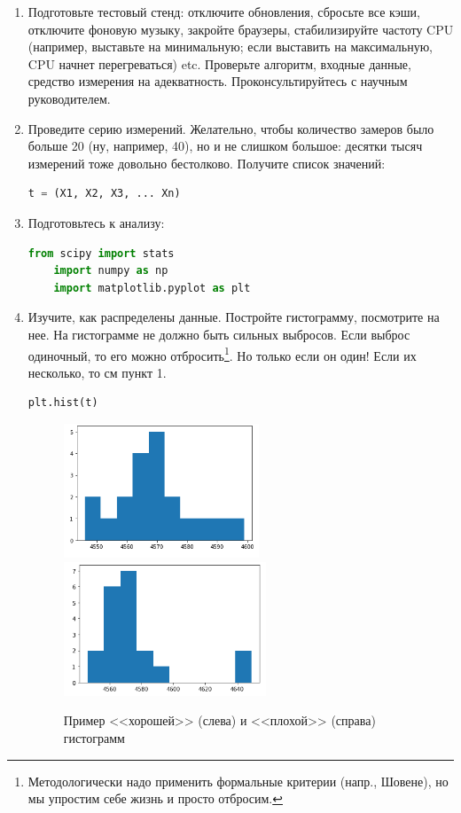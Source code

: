 \documentclass{article}
\begin{document}
\begin {enumerate}

\item Подготовьте тестовый стенд: отключите обновления, сбросьте все кэши, отключите фоновую музыку, закройте браузеры, стабилизируйте частоту CPU (например, выставьте на минимальную; если выставить на максимальную, CPU начнет перегреваться) etc. Проверьте алгоритм, входные данные, средство измерения на адекватность. Проконсультируйтесь с научным руководителем.

\item Проведите серию измерений. Желательно, чтобы количество замеров было больше 20 (ну, например, 40), но и не слишком большое: десятки тысяч измерений тоже довольно бестолково. Получите список значений:
\begin{lstlisting}[language=Python]
	t = (X1, X2, X3, ... Xn)
\end{lstlisting}

\item Подготовьтесь к анализу:
\begin{lstlisting}[language=Python]
	from scipy import stats
	import numpy as np
	import matplotlib.pyplot as plt
\end{lstlisting}

\item Изучите, как распределены данные. Постройте гистограмму, посмотрите на нее. На гистограмме не должно быть сильных выбросов. Если выброс одиночный, то его можно отбросить\footnote{Методологически надо применить формальные критерии (напр., Шовене), но мы упростим себе жизнь и просто отбросим.}. Но только если он один! Если их несколько, то см пункт 1.
\begin{lstlisting}[language=Python]
	plt.hist(t)
\end{lstlisting}

\begin{figure}[h]
\centering
\includegraphics[height=4cm]{hist.png}
\includegraphics[height=4cm]{hist2.png}
\caption{Пример <<хорошей>> (слева) и <<плохой>> (справа) гистограмм}
\end{figure}


\end{enumerate}
\end{document}
